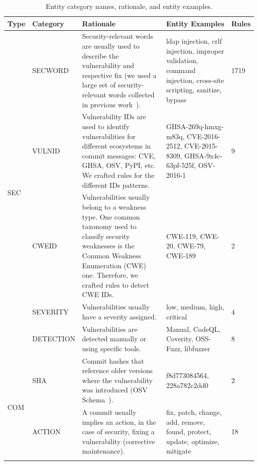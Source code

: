 \begin{table}[t!]
\footnotesize
    \centering
        \caption{Entity category names, rationale, and entity examples.} 
    \begin{tabular}{ | p{0.5cm} | p{1.4cm} | p{8.5cm} | p{5.5cm} |  p{0.5cm} | }
    \hline
         \textbf{Type} & \textbf{Category} & \textbf{Rationale} & \textbf{Entity Examples} & \textbf{Rules} \\\hline
        
        \multirow{5}{*}{SEC} & SECWORD & Security-relevant words are usually used to describe the vulnerability and respective fix (we used a large set of security-relevant words collected in previous work~\cite{10.1145/3133956.3134072,10.1145/3475716.3475781}). & ldap injection, crlf injection, improper validation, command injection, cross-site scripting, sanitize, bypass & 1719 \\\cline{2-5}
        
        & VULNID & Vulnerability IDs are used to identify vulnerabilities for different ecosystems in commit messages: CVE, GHSA, OSV, PyPI, etc. We crafted rules for the different IDs patterns. & GHSA-269q-hmxg-m83q, CVE-2016-2512, CVE-2015-8309, GHSA-9x4c-63pf-525f, OSV-2016-1 & 9
        \\\cline{2-5}
        
        & CWEID & Vulnerabilities usually belong to a weakness type. One common taxonomy used to classify security weaknesses is the Common Weakness Enumeration (CWE) one. Therefore, we crafted rules to detect CWE IDs. & CWE-119, CWE-20, CWE-79, CWE-189 & 2 \\\cline{2-5}
        
        & SEVERITY & Vulnerabilities usually have a severity assigned. & low, medium, high, critical & 4\\\cline{2-5}
        
        & DETECTION & Vulnerabilities are detected manually or using specific tools. & Manual, CodeQL, Coverity, OSS-Fuzz, libfuzzer & 8\\\hline
        
        \multirow{7}{*}{COM} & SHA & Commit hashes that reference older versions where the vulnerability was introduced (OSV Schema~\cite{osv-schema}). &  f8d773084564, 228a782c2dd0 & 2
        \\\cline{2-5}

        & ACTION  & A commit usually implies an action, in the case of security, 
        fixing a vulnerability (corrective maintenance). & fix, patch, change, add, remove, found, protect, update, optimize, mitigate & 18\\\cline{2-5}
        

\end{tabular}
\end{table}

